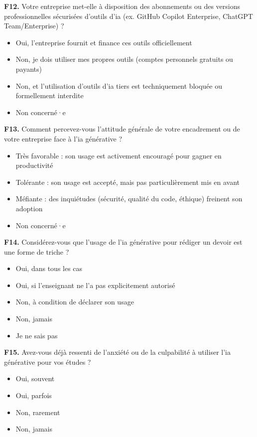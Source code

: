 \textbf{F12.} Votre entreprise met-elle à disposition des abonnements ou
des versions professionnelles sécurisées d'outils d'\gls{ia} (ex. GitHub
Copilot Enterprise, ChatGPT Team/Enterprise) ?
\begin{itemize}[label=$\square$, leftmargin=1.5cm]
  \item Oui, l'entreprise fournit et finance ces outils officiellement
  \item Non, je dois utiliser mes propres outils (comptes personnels gratuits ou payants)
  \item Non, et l'utilisation d'outils d'\gls{ia} tiers est techniquement bloquée ou formellement interdite
  \item Non concerné·e
\end{itemize}

\textbf{F13.} Comment percevez-vous l'attitude générale de votre encadrement
ou de votre entreprise face à l'\gls{ia} générative ?
\begin{itemize}[label=$\square$, leftmargin=1.5cm]
  \item Très favorable : son usage est activement encouragé pour gagner en productivité
  \item Tolérante : son usage est accepté, mais pas particulièrement mis en avant
  \item Méfiante : des inquiétudes (sécurité, qualité du code, éthique) freinent son adoption
  \item Non concerné·e
\end{itemize}
 
\textbf{F14.} Considérez-vous que l'usage de l'\gls{ia} générative pour
rédiger un devoir est une forme de triche ?
\begin{itemize}[label=$\square$, leftmargin=1.5cm]
  \item Oui, dans tous les cas
  \item Oui, si l'enseignant ne l'a pas explicitement autorisé
  \item Non, à condition de déclarer son usage
  \item Non, jamais
  \item Je ne sais pas
\end{itemize}
 
\textbf{F15.} Avez-vous déjà ressenti de l'anxiété ou de la culpabilité
à utiliser l'\gls{ia} générative pour vos études ?
\begin{itemize}[label=$\square$, leftmargin=1.5cm]
  \item Oui, souvent
  \item Oui, parfois
  \item Non, rarement
  \item Non, jamais
\end{itemize}

